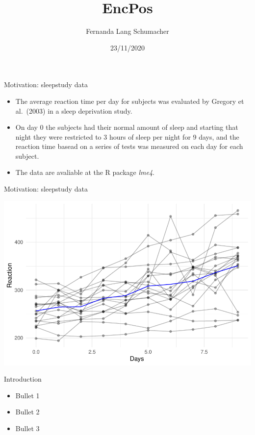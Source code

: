 \documentclass[
  ignorenonframetext,
]{beamer}
\title{EncPos}
\author{Fernanda Lang Schumacher}
\date{23/11/2020}
\providecommand{\tightlist}{%
  \setlength{\itemsep}{0pt}\setlength{\parskip}{0pt}}
\begin{document}
\frame{\titlepage}

\begin{frame}{Motivation: sleepstudy data}
\protect\hypertarget{motivation-sleepstudy-data}{}

\begin{itemize}
\tightlist
\item
  The average reaction time per day for subjects was evaluated by
  Gregory et al.~(2003) in a sleep deprivation study.
\item
  On day 0 the subjects had their normal amount of sleep and starting
  that night they were restricted to 3 hours of sleep per night for 9
  days, and the reaction time basead on a series of tests was measured
  on each day for each subject.
\item
  The data are avaliable at the R package \emph{lme4}.
\end{itemize}

\end{frame}

\begin{frame}{Motivation: sleepstudy data}
\protect\hypertarget{motivation-sleepstudy-data-1}{}

\begin{center}\includegraphics[width=0.85\linewidth]{codes_files/figure-beamer/data-1} \end{center}

\end{frame}

\begin{frame}{Introduction}
\protect\hypertarget{introduction}{}

\begin{itemize}
\tightlist
\item
  Bullet 1
\item
  Bullet 2
\item
  Bullet 3
\end{itemize}

\end{frame}
\end{document}
